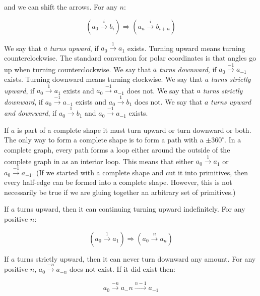\documentclass[acmtog]{acmart}
\begin{document}
and we can shift the arrows. For any $n$:

\begin{equation}
\left(a_0 \xrightarrow{i} b_i\right) \Rightarrow \left(a_n \xrightarrow{i} b_{i+n}\right)
\end{equation}

We say that $a$ \textit{turns upward}, if $a_0 \xrightarrow{1} a_1$
exists. Turning upward means turning counterclockwise. The standard convention
for polar coordinates is that angles go up when turning counterclockwise. \newline
We say that $a$ \textit{turns downward}, if $a_0 \xrightarrow{-1} a_{-1}$
exists. Turning downward means turning clockwise. \newline
We say that $a$ \textit{turns strictly upward}, if $a_0 \xrightarrow{1} a_1$ exists and
$a_0 \xrightarrow{-1} a_{-1}$ does not. \newline
We say that $a$ \textit{turns strictly downward}, if $a_0 \xrightarrow{-1} a_{-1}$ exists and
$a_0 \xrightarrow{1} b_{1}$ does not. \newline
We say that $a$ \textit{turns upward and downward}, if $a_0 \xrightarrow{1} b_{1}$
and $a_0 \xrightarrow{-1} a_{-1}$ exists. \newline

If $a$ is part of a complete shape it must turn upward or turn downward or both. The
only way to form a complete shape is to form a path with a $\pm 360^{\circ}$.
In a complete graph, every path forms a loop either around the outside of the
complete graph in as an interior loop. This means that either $a_0 \xrightarrow{1} a_1$ or
$a_0 \xrightarrow{-1} a_{-1}$. (If we started with a complete shape and cut it
into primitives, then every half-edge can be formed into a complete shape.
However, this is not necessarily be true if we are gluing together an arbitrary set of
primitives.)

If $a$ turns upward, then it can continuing turning upward indefinitely. For any positive $n$:

\begin{equation}
\left(a_0 \xrightarrow{1} a_1\right) \Rightarrow \left(a_0 \xrightarrow{n} a_{n}\right)
\end{equation}

If $a$ turns strictly upward, then it can never turn downward any amount. For
any positive $n$, $a_0 \xrightarrow{-n} a_{-n}$ does not exist. If it did exist then:

\begin{equation}
\label{nonnegative}
a_0 \xrightarrow{-n} a_-n \xrightarrow{n-1} a_{-1}
\end{equation}
\end{document}
